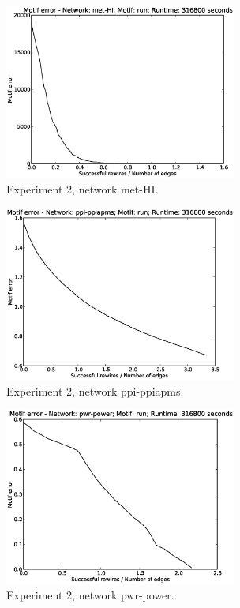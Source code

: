 \begin{figure}[p]
\centering
\includegraphics[width=3in]{Figures/motif_error-met-HI-run.eps}
\caption{Experiment 2, network met-HI.}
\label{fig:exp2-met-HI-run}
\end{figure}

\begin{figure}[p]
\centering
\includegraphics[width=3in]{Figures/motif_error-ppi-ppiapms-run.eps}
\caption{Experiment 2, network ppi-ppiapms.}
\label{fig:exp2-ppi-ppiapms-run}
\end{figure}

\begin{figure}[p]
\centering
\includegraphics[width=3in]{Figures/motif_error-pwr-power-run.eps}
\caption{Experiment 2, network pwr-power.}
\label{fig:exp2-pwr-power-run}
\end{figure}

